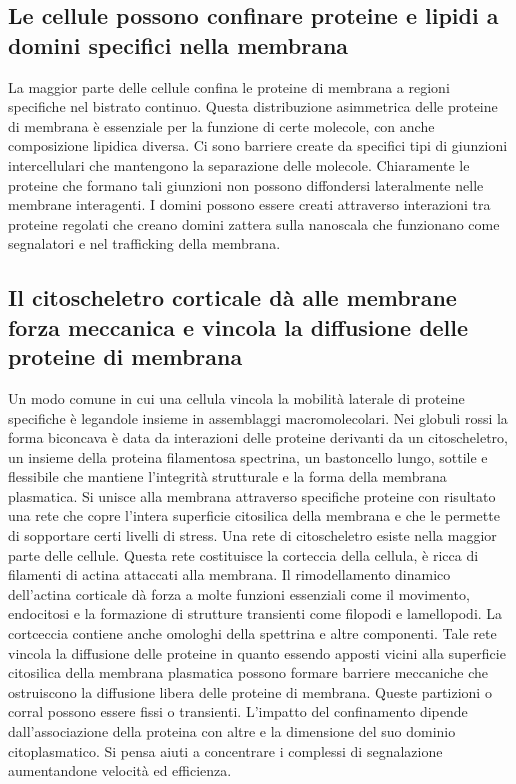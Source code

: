 \subsection{Le cellule possono confinare proteine e lipidi a domini specifici nella membrana}
La maggior parte delle cellule confina le proteine di membrana a regioni specifiche nel bistrato continuo. Questa distribuzione asimmetrica delle proteine di membrana \`e essenziale per
la funzione di certe molecole, con anche composizione lipidica diversa. Ci sono barriere create da specifici tipi di giunzioni intercellulari che mantengono la separazione delle 
molecole. Chiaramente le proteine che formano tali giunzioni non possono diffondersi lateralmente nelle membrane interagenti. I domini possono essere creati attraverso interazioni tra
proteine regolati che creano domini zattera sulla nanoscala che funzionano come segnalatori e nel trafficking della membrana. 	
\subsection{Il citoscheletro corticale d\`a alle membrane forza meccanica e vincola la diffusione delle proteine di membrana}
Un modo comune in cui una cellula vincola la mobilit\`a laterale di proteine specifiche \`e legandole insieme in assemblaggi macromolecolari. Nei globuli rossi la forma biconcava \`e 
data da interazioni delle proteine derivanti da un citoscheletro, un insieme della proteina filamentosa spectrina, un bastoncello lungo, sottile e flessibile che mantiene l'integrit\`a
strutturale e la forma della membrana plasmatica. Si unisce alla membrana attraverso specifiche proteine con risultato una rete che copre l'intera superficie citosilica della 
membrana e che le permette di sopportare certi livelli di stress. Una rete di citoscheletro esiste nella maggior parte delle cellule. Questa rete costituisce la corteccia della cellula,
\`e ricca di filamenti di actina attaccati alla membrana. Il rimodellamento dinamico dell'actina corticale d\`a forza a molte funzioni essenziali come il movimento, endocitosi e la
formazione di strutture transienti come filopodi e lamellopodi. La cortceccia contiene anche omologhi della spettrina e altre componenti. Tale rete vincola la diffusione delle proteine
in quanto essendo apposti vicini alla superficie citosilica della membrana plasmatica possono formare barriere meccaniche che ostruiscono la diffusione libera delle proteine di membrana.
Queste partizioni o corral possono essere fissi o transienti. L'impatto del confinamento dipende dall'associazione della proteina con altre e la dimensione del suo dominio 
citoplasmatico. Si pensa aiuti a concentrare i complessi di segnalazione aumentandone velocit\`a ed efficienza.
